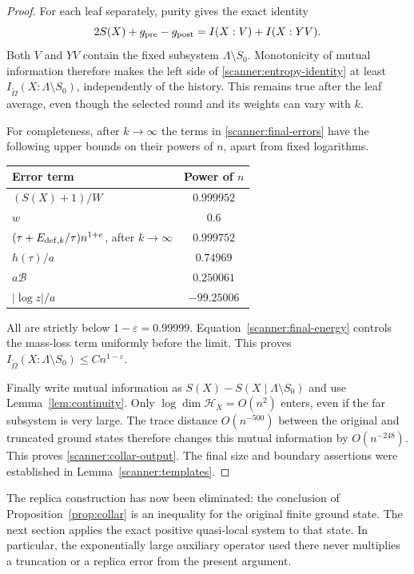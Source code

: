 \begin{proof}
For each leaf separately, purity gives the exact identity
\begin{equation}
 2S(X)+g_{\rm pre}-g_{\rm post}
       =I(X:V)+I(X:YV).
 \label{scanner:entropy-identity}
\end{equation}
Both \(V\) and \(YV\) contain the fixed subsystem
\(\Lambda\setminus S_0\).  Monotonicity of mutual information
therefore makes the left side of \eqref{scanner:entropy-identity}
at least \(I_{\widetilde\Omega}(X:\Lambda\setminus S_0)\),
independently of the history.  This remains true after the leaf average,
even though the selected round and its weights can vary with \(k\).

For completeness, after \(k\to\infty\) the terms in
\eqref{scanner:final-errors} have the following upper bounds on their
powers of \(n\), apart from fixed logarithms.
\begin{center}
\begin{tabular}{@{}lc@{}}
\toprule
Error term & Power of $n$\\
\midrule
$(S(X)+1)/W$ & $0.999952$\\
$w$ & $0.6$\\
$(\tau+E_{{\rm def},k}/\tau)n^{1+e}$, after $k\to\infty$ & $0.999752$\\
$h(\tau)/a$ & $0.74969$\\
$a\mathcal B$ & $0.250061$\\
$|\log z|/a$ & $-99.25006$\\
\bottomrule
\end{tabular}
\end{center}
All are strictly below \(1-\varepsilon=0.99999\).
Equation~\eqref{scanner:final-energy} controls the mass-loss term
uniformly before the limit.  This proves
\(I_{\widetilde\Omega}(X:\Lambda\setminus S_0)
\le Cn^{1-\varepsilon}\).

Finally write mutual information as
\(S(X)-S(X\mid\Lambda\setminus S_0)\) and use
Lemma~\ref{lem:continuity}.  Only \(\log\dim\mathcal H_X=O(n^2)\)
enters, even if the far subsystem is very large.  The trace distance
\(O(n^{-500})\) between the original and truncated ground states
therefore changes this mutual information by \(O(n^{-248})\).
This proves \eqref{scanner:collar-output}.  The final size and boundary
assertions were established in Lemma~\ref{scanner:templates}.
\end{proof}

The replica construction has now been eliminated: the conclusion of
Proposition~\ref{prop:collar} is an inequality for the original finite
ground state.  The next section applies the exact positive quasi-local
system to that state.  In particular, the exponentially large auxiliary
operator used there never multiplies a truncation or a replica error
from the present argument.
